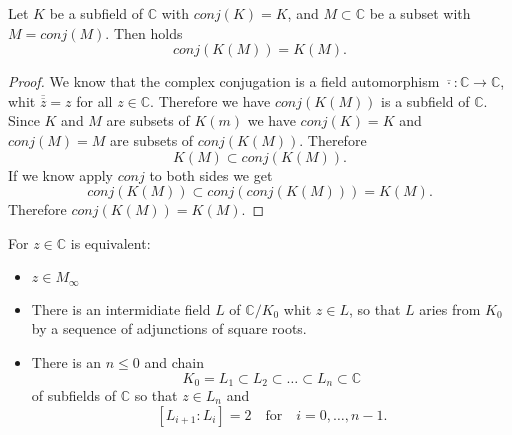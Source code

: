 \begin{lemma}
    \label{lem:conj_of_adjoin}
    Let $K$ be a subfield of $\mathbb{C}$ with $conj(K)=K$, and $ M \subset \mathbb{C}$ be a subset with $M = conj(M)$. Then holds
    \begin{equation*}
        conj(K(M)) = K(M).
    \end{equation*}
\end{lemma}
\begin{proof}
    We know that the complex conjugation is a field automorphism $\overline{\cdot }: \mathbb{C} \to \mathbb{C}$, whit $\overline{\overline{z}} = z$ for all $z \in \mathbb{C}$. Therefore we have
    $conj(K(M))$ is a subfield of $\mathbb{C}$.\\
    Since $K$ and $M$ are subsets of $K(m)$ we have $conj(K) = K$ and $conj(M) = M$ are subsets of $conj(K(M))$. Therefore $$K(M) \subset conj(K(M)).$$
    If we know apply $conj$ to both sides we get
    $$conj(K(M)) \subset conj(conj(K(M))) = K(M).$$
    Therefore $conj(K(M)) = K(M)$.
\end{proof}



\begin{theorem}
    \label{thm:Z_in_Minf_1}
    For $z \in \mathbb{C}$ is equivalent:
    \begin{itemize}
        \item $z \in M_{\infty}$
        \item There is an intermidiate field $L$ of $\mathbb{C}/K_0$ whit $z \in L$, so that $L$ aries from $K_0$ by a sequence of adjunctions of square roots.
        \item There is an $n\le 0$ and chain 
            $$K_0 = L_1 \subset L_2 \subset \ldots \subset L_n \subset \mathbb{C}$$
            of subfields of $\mathbb{C}$ so that $z \in L_n$ and 
            $$ [L_{i+1}:L_i] = 2 \quad \text{for} \quad i = 0, \ldots, n-1.$$
    \end{itemize}
\end{theorem}

